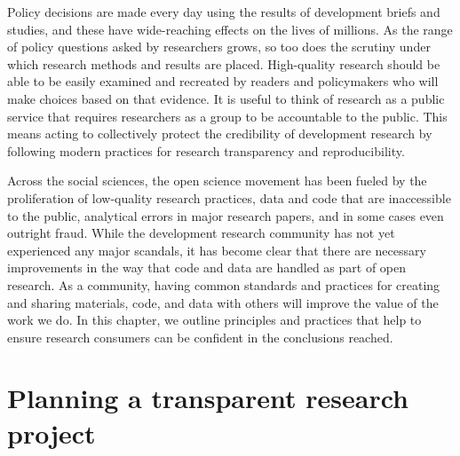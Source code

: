 
\begin{fullwidth}

	Policy decisions are made every day using the results of development briefs and studies,
	and these have wide-reaching effects on the lives of millions.
	As the range of policy questions asked by researchers grows,
	so too does the scrutiny under which research methods and results are placed.
  High-quality research should be able to be easily examined and recreated by readers
  and policymakers who will make choices based on that evidence.
	It is useful to think of research as a public service
  that requires researchers as a group to be accountable to the public.
	This means acting to collectively protect the credibility of development research
	by following modern practices for research transparency and reproducibility.

  Across the social sciences, the open science movement has been fueled
  by the proliferation of low-quality research practices,
	data and code that are inaccessible to the public,
  analytical errors in major research papers,
	and in some cases even outright fraud.
  While the development research community has not yet
  experienced any major scandals,
  it has become clear that there are necessary improvements
	in the way that code and data are handled as part of open research.
  As a community, having common standards and practices
  for creating and sharing materials, code, and data with others
  will improve the value of the work we do.
	In this chapter, we outline principles and practices that help to ensure
	research consumers can be confident in the conclusions reached.

\end{fullwidth}


\section{Planning a transparent research project}

